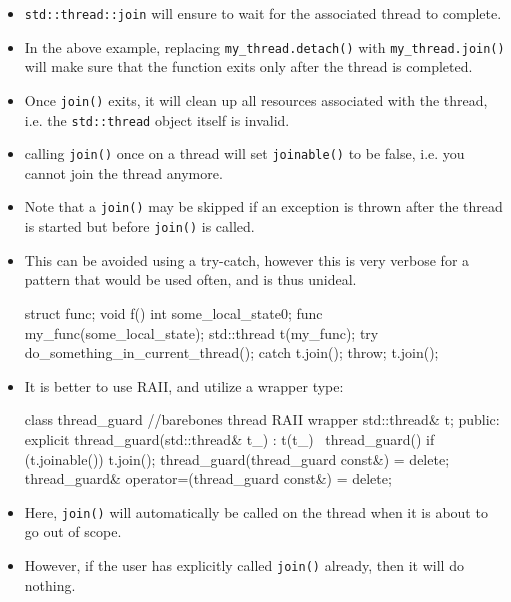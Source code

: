 \documentclass[11pt, a4paper]{article}
\theoremstyle{definition}
\theoremstyle{remark}
\newcommand{\code}[1]{\lstinline|#1|}
\begin{document}
\begin{itemize}
\begin{cppcode}
void oops() {
    int some_local_state{0};
    func my_func(some_local_state);
    std::thread my_thread(my_func);
    my_thread.detach(); //dont wait for thread to finish
} // local variable some_local_state goes out of scope; thread still has reference

int main() {
    oops();
    std::cout << "Here!\n"; //prevent compiler optimizing this away
    return 0;
}
\end{cppcode}
    \item \code{std::thread::join} will ensure to wait for the associated thread to complete. 
    \item In the above example, replacing \code{my_thread.detach()} with \code{my_thread.join()} will make sure that the function exits only after the thread is completed.
    \item Once \code{join()} exits, it will clean up all resources associated with the thread, i.e. the \code{std::thread} object itself is invalid. 
    \item calling \code{join()} once on a thread will set \code{joinable()} to be false, i.e. you cannot join the thread anymore.
    \item Note that a \code{join()} may be skipped if an exception is thrown after the thread is started but before \code{join()} is called. 
    \item This can be avoided using a try-catch, however this is very verbose for a pattern that would be used often, and is thus unideal.
\newpage
\begin{cppcode}
struct func;
void f() {
    int some_local_state{0};
    func my_func(some_local_state);
    std::thread t(my_func);
    try {
        do_something_in_current_thread();
    } catch {
        t.join();
        throw;
    }
    t.join();
}
\end{cppcode}
    \item It is better to use RAII, and utilize a wrapper type:
\begin{cppcode}
class thread_guard {
//barebones thread RAII wrapper
    std::thread& t;
public:
    explicit thread_guard(std::thread& t_) : t(t_) {}
    ~thread_guard() {
        if (t.joinable()) t.join();
    }
    thread_guard(thread_guard const&) = delete;
    thread_guard& operator=(thread_guard const&) = delete;
}
\end{cppcode}
    \item Here, \code{join()} will automatically be called on the thread when it is about to go out of scope. 
    \item However, if the user has explicitly called \code{join()} already, then it will do nothing.

\end{itemize}
\end{document}
